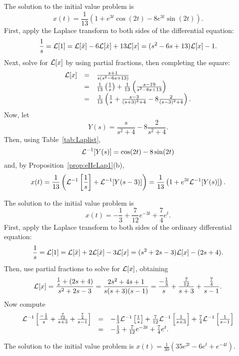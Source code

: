\documentclass{ximera}
\begin{document}
 \ans The solution to the initial value problem is
\[
x(t) = \frac{1}{13}\left(1 + e^{3t}\cos(2t) - 8e^{3t}\sin(2t)\right).
\]
\soln First, apply the Laplace transform to both sides of the differential
equation:
\[
\frac{1}{s} = {\cal L}[1]
= {\cal L}[\ddot{x}] - 6{\cal L}[\dot{x}] + 13{\cal L}[x]
= (s^2 - 6s + 13){\cal L}[x] - 1.
\]
Next, solve for ${\cal L}[x]$ by using partial fractions, then completing
the square:
\[
\begin{array}{rcl}
{\cal L}[x] & = & \frac{s + 1}{s(s^2 - 6s + 13)} \\
& = & \frac{1}{13}\left(\frac{1}{s}\right) +
\frac{1}{13}\left(\frac{s - 19}{s^2 - 6s + 13}\right) \\
& = & \frac{1}{13}\left(\frac{1}{s} +
\frac{s - 3}{(s + 3)^2 + 4} - 8\frac{2}{(s - 3)^2 + 4}\right).
\end{array}
\]
Now, let
\[
Y(s) = \frac{s}{s^2 + 4} - 8\frac{2}{s^2 + 4}.
\]
Then, using Table~\ref{tab:Laplist},
\[
{\cal L}^{-1}[Y(s)] = \cos(2t) - 8\sin(2t)
\]
and, by Proposition~\ref{prop:eHcLap1}(b),
\[
x(t) = \frac{1}{13}\left({\cal L}^{-1}\left[\frac{1}{s}\right] +
{\cal L}^{-1}[Y(s - 3)]\right) =
\frac{1}{13}\left(1 + e^{3t}{\cal L}^{-1}[Y(s)]\right).
\]



 \ans The solution to the initial value problem is
\[
x(t) = -\frac{1}{3} + \frac{7}{12}e^{-3t} + \frac{7}{4}e^t.
\]
\soln First, apply the Laplace transform to both sides of the ordinary
differential equation:
\[
\frac{1}{s} = {\cal L}[1]
= {\cal L}[\ddot{x}] + 2{\cal L}[\dot{x}] - 3{\cal L}[x]
= (s^2 + 2s - 3){\cal L}[x] - (2s + 4).
\]
Then, use partial fractions to solve for ${\cal L}[x]$, obtaining
\[
{\cal L}[x] = \frac{\frac{1}{s} + (2s + 4)}{s^2 + 2s - 3}
= \frac{2s^2 + 4s + 1}{s(s + 3)(s - 1)}
= \frac{-\frac{1}{3}}{s} + \frac{\frac{7}{12}}{s + 3}
+ \frac{\frac{7}{4}}{s - 1}.
\]
Now compute
\[
\begin{array}{rcl}
{\cal L}^{-1}\left[\frac{-\frac{1}{3}}{s} + \frac{\frac{7}{12}}{s + 3}
+ \frac{\frac{7}{4}}{s - 1}\right]
& = & -\frac{1}{3}{\cal L}^{-1}\left[\frac{1}{s}\right]
+ \frac{7}{12}{\cal L}^{-1}\left[\frac{1}{s + 3}\right]
+ \frac{7}{4}{\cal L}^{-1}\left[\frac{1}{s - 1}\right] \\
& = & -\frac{1}{3} + \frac{7}{12}e^{-3t} + \frac{7}{4}e^t.
\end{array}
\]

 \ans The solution to the initial value problem is
$x(t) = \frac{1}{30}(35e^{2t}-6e^t+e^{-4t})$.
\end{document}

